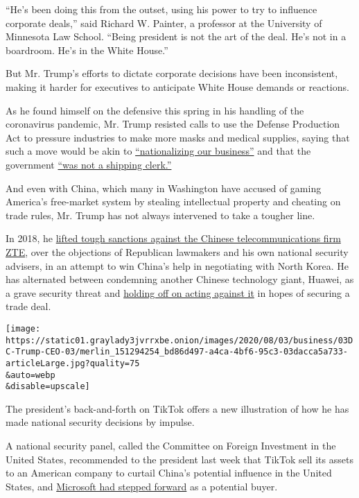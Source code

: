 ``He's been doing this from the outset, using his power to try to
influence corporate deals,'' said Richard W. Painter, a professor at the
University of Minnesota Law School. ``Being president is not the art of
the deal. He's not in a boardroom. He's in the White House.''

But Mr. Trump's efforts to dictate corporate decisions have been
inconsistent, making it harder for executives to anticipate White House
demands or reactions.

As he found himself on the defensive this spring in his handling of the
coronavirus pandemic, Mr. Trump resisted calls to use the Defense
Production Act to pressure industries to make more masks and medical
supplies, saying that such a move would be akin to
\href{https://www.nytimes3xbfgragh.onion/2020/03/31/us/politics/coronavirus-defense-production-act.html}{``nationalizing
our business''} and that the government
\href{https://www.nytimes3xbfgragh.onion/2020/03/20/us/politics/trump-coronavirus-supplies.html}{``was
not a shipping clerk.''}

And even with China, which many in Washington have accused of gaming
America's free-market system by stealing intellectual property and
cheating on trade rules, Mr. Trump has not always intervened to take a
tougher line.

In 2018, he
\href{https://www.nytimes3xbfgragh.onion/2018/06/07/business/us-china-zte-deal.html}{lifted
tough sanctions against the Chinese telecommunications firm ZTE}, over
the objections of Republican lawmakers and his own national security
advisers, in an attempt to win China's help in negotiating with North
Korea. He has alternated between condemning another Chinese technology
giant, Huawei, as a grave security threat and
\href{https://www.nytimes3xbfgragh.onion/2019/11/15/business/us-reprieve-huawei.html}{holding
off on acting against it} in hopes of securing a trade deal.

\texttt{[image: https://static01.graylady3jvrrxbe.onion/images/2020/08/03/business/03DC-Trump-CEO-03/merlin\_151294254\_bd86d497-a4ca-4bf6-95c3-03dacca5a733-articleLarge.jpg?quality=75\\\&auto=webp\\\&disable=upscale]}

The president's back-and-forth on TikTok offers a new illustration of
how he has made national security decisions by impulse.

A national security panel, called the Committee on Foreign Investment in
the United States, recommended to the president last week that TikTok
sell its assets to an American company to curtail China's potential
influence in the United States, and
\href{https://www.nytimes3xbfgragh.onion/2020/07/31/technology/tiktok-microsoft.html}{Microsoft
had stepped forward} as a potential buyer.


